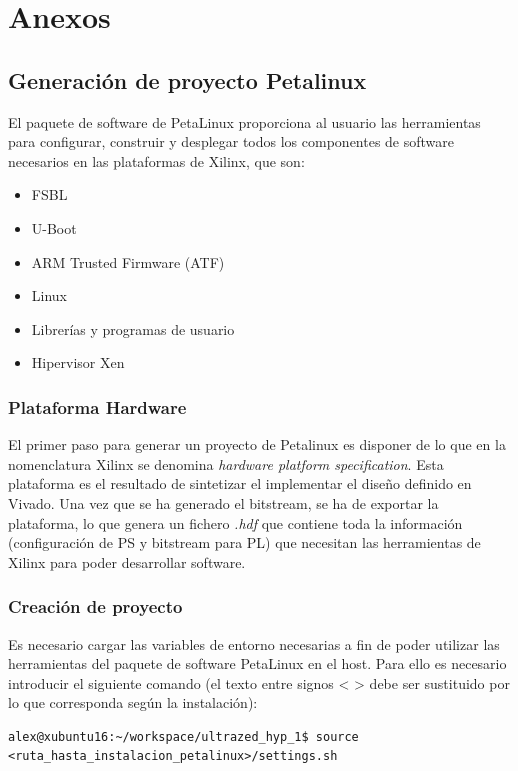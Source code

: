 \chapter{Anexos}

\section{Generación de proyecto Petalinux} \label{petalinux}

El paquete de software de PetaLinux proporciona al usuario las herramientas para configurar, construir y desplegar todos los componentes de software necesarios en las plataformas de Xilinx, que son:
\begin{itemize}
  \item \acrshort{FSBL}
  \item U-Boot
  \item ARM Trusted Firmware (\acrshort{ATF})
  \item Linux
  \item Librerías y programas de usuario
  \item Hipervisor Xen
\end{itemize}


\subsection{Plataforma Hardware}
El primer paso para generar un proyecto de Petalinux es disponer de lo que en la nomenclatura Xilinx se denomina \textit{hardware platform specification}. Esta plataforma es el resultado de sintetizar el implementar el diseño definido en Vivado. Una vez que se ha generado el bitstream, se ha de exportar la plataforma, lo que genera un fichero \textit{.hdf} que contiene toda la información (configuración de \acrshort{PS} y bitstream para \acrshort{PL}) que necesitan las herramientas de Xilinx para poder desarrollar software.

\subsection{Creación de proyecto}
Es necesario cargar las variables de entorno necesarias a fin de poder utilizar las herramientas del paquete de software PetaLinux en el host. Para ello es necesario introducir el siguiente comando (el texto entre signos < > debe ser sustituido por lo que corresponda según la instalación):\\

\begin{lstlisting}[style=CStyle]
alex@xubuntu16:~/workspace/ultrazed_hyp_1$ source <ruta_hasta_instalacion_petalinux>/settings.sh
\end{lstlisting}

